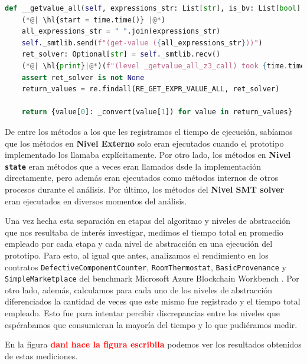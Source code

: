 \begin{lstlisting}[language=Python,
    label={code:getvalueall-modification},
    caption=\text{Método \texttt{\_\_get\_value\_all} del modulo \textbf{\texttt{smtlib}} modificado para registrar el tiempo empleado por la llamada al SMT solver. El resaltado indica las líneas agregadas para registrar el tiempo.},
    captionpos=b]
def __getvalue_all(self, expressions_str: List[str], is_bv: List[bool]) -> Dict[str, int]:
    (*@| \hl{start = time.time()} |@*)
    all_expressions_str = " ".join(expressions_str)
    self._smtlib.send(f"(get-value ({all_expressions_str}))")
    ret_solver: Optional[str] = self._smtlib.recv()
    (*@| \hl{print}|@*)(f"(level _getvalue_all_z3_call) took {time.time()- start} seconds")
    assert ret_solver is not None
    return_values = re.findall(RE_GET_EXPR_VALUE_ALL, ret_solver)
    
    return {value[0]: _convert(value[1]) for value in return_values}
\end{lstlisting}

De  entre los métodos a los que les registramos el tiempo de ejecución, sabíamos que los métodos en \textbf{Nivel Externo} solo eran ejecutados cuando el prototipo implementado los llamaba explícitamente.
Por otro lado, los métodos en \textbf{Nivel \texttt{state}} eran métodos que a veces eran llamados dsde la implementación directamente, pero además eran ejecutados como métodos internos de otros procesos durante el análisis.
Por último, los métodos del \textbf{Nivel SMT solver} eran ejecutados en diversos momentos del análisis.

Una vez hecha esta separación en etapas del algoritmo y niveles de abstracción que nos resultaba de interés investigar, medimos el tiempo total en promedio empleado por cada etapa y cada nivel de abstracción en una ejecución del prototipo.
Para esto, al igual que antes, analizamos el rendimiento en los contratos \texttt{DefectiveComponentCounter}, \texttt{RoomThermostat}, \texttt{BasicProvenance} y \texttt{SimpleMarketplace} del benchmark Microsoft Azure Blockchain Workbench \cite{azure-benchmark}.
Por otro lado, además, calculamos para cada uno de los niveles de abstracción diferenciados la cantidad de veces que este mismo fue registrado y el tiempo total empleado.
Esto fue para intentar percibir discrepancias entre los niveles que espérabamos que consumieran la mayoría del tiempo y lo que pudiéramos medir.

En la figura \textcolor{red}{\textbf{dani hace la figura escribila}} podemos ver los resultados obtenidos de estas mediciones.


